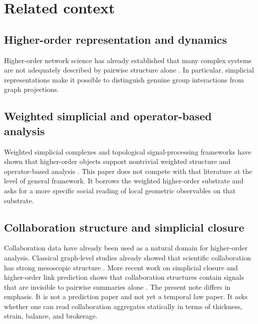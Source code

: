 \documentclass[11pt]{article}
\begin{document}
\section{Related context}

\subsection*{Higher-order representation and dynamics}

Higher-order network science has already established that many complex systems are not adequately described by pairwise structure alone \cite{BensonGleichLeskovec2016,BattistonCencettiIacopiniEtAl2020,BattistonLucasCencettiEtAl2023,BickGrossHarringtonSchaub2023}. In particular, simplicial representations make it possible to distinguish genuine group interactions from graph projections.

\subsection*{Weighted simplicial and operator-based analysis}

Weighted simplicial complexes and topological signal-processing frameworks have shown that higher-order objects support nontrivial weighted structure and operator-based analysis \cite{BarbarossaSardellitti2020,TorresBianconi2020,BacciniGeraciBianconi2022}. This paper does not compete with that literature at the level of general framework. It borrows the weighted higher-order substrate and asks for a more specific social reading of local geometric observables on that substrate.

\subsection*{Collaboration structure and simplicial closure}

Collaboration data have already been used as a natural domain for higher-order analysis. Classical graph-level studies already showed that scientific collaboration has strong mesoscopic structure \cite{Newman2001}. More recent work on simplicial closure and higher-order link prediction shows that collaboration structures contain signals that are invisible to pairwise summaries alone \cite{BensonASJK18}. The present note differs in emphasis. It is not a prediction paper and not yet a temporal law paper. It asks whether one can read collaboration aggregates statically in terms of thickness, strain, balance, and brokerage.
\end{document}
